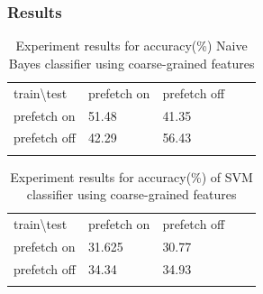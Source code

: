\subsubsection{Results}
\begin{table}[]
\centering
\caption{Experiment results for accuracy(\%) Naive Bayes classifier using coarse-grained features}
\label{table:rq1-nb}
\begin{tabular}{lllll}
\cline{1-3}
\multicolumn{1}{|l|}{train\textbackslash test} & \multicolumn{1}{l|}{prefetch on} & \multicolumn{1}{l|}{prefetch off} &  &  \\ \cline{1-3}
\multicolumn{1}{|l|}{prefetch on}                    & \multicolumn{1}{l|}{51.48}         & \multicolumn{1}{l|}{41.35}          &  &  \\ \cline{1-3}
\multicolumn{1}{|l|}{prefetch off}                   & \multicolumn{1}{l|}{42.29}         & \multicolumn{1}{l|}{56.43}          &  &  \\ \cline{1-3}
                                                     &                                  &                                   &  & 
\end{tabular}                  
\end{table}

\begin{table}[]
\centering
\caption{Experiment results for accuracy(\%) of SVM classifier using coarse-grained features}
\label{table:rq1-svm}
\begin{tabular}{lllll}
\cline{1-3}
\multicolumn{1}{|l|}{train\textbackslash test} & \multicolumn{1}{l|}{prefetch on} & \multicolumn{1}{l|}{prefetch off} &  &  \\ \cline{1-3}
\multicolumn{1}{|l|}{prefetch on}                    & \multicolumn{1}{l|}{31.625}         & \multicolumn{1}{l|}{30.77}          &  &  \\ \cline{1-3}
\multicolumn{1}{|l|}{prefetch off}                   & \multicolumn{1}{l|}{34.34}         & \multicolumn{1}{l|}{34.93}          &  &  \\ \cline{1-3}
                                                     &                                  &                                   &  & 
\end{tabular}                  
\end{table}

